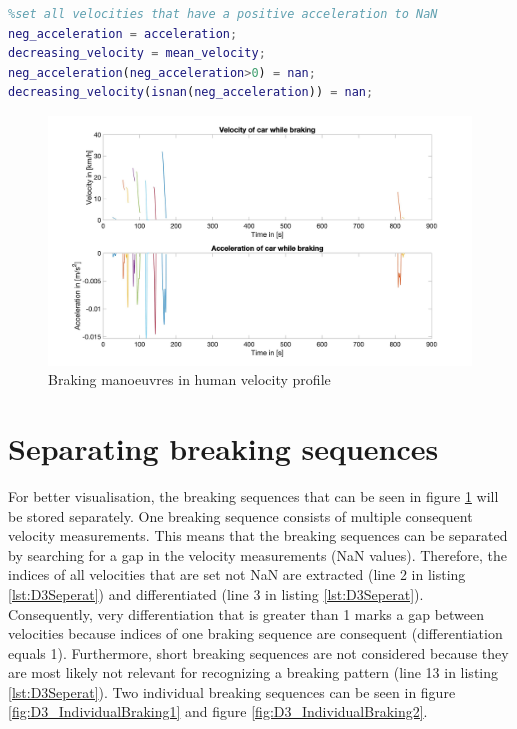 \begin{lstlisting}[language=Matlab,basicstyle=\scriptsize	,caption= Extracting negative acceleration,label= lst:D3Extract]
%search for negative acceleration and set positive acceleration to NaN
%set all velocities that have a positive acceleration to NaN
neg_acceleration = acceleration;
decreasing_velocity = mean_velocity;
neg_acceleration(neg_acceleration>0) = nan;
decreasing_velocity(isnan(neg_acceleration)) = nan;
\end{lstlisting}

\begin{figure}[H]
\centering
\includegraphics[width=1\textwidth]{images/D3_individual_braking.jpg}
\caption{Braking manoeuvres in human velocity profile}
\label{fig:D3_IndividualBraking}
\end{figure}


\section{Separating breaking sequences}
For better visualisation, the breaking sequences that can be seen in figure \ref{fig:D3_IndividualBraking} will be stored separately.
One breaking sequence consists of multiple consequent velocity measurements.
This means that the breaking sequences can be separated by searching for a gap in the velocity measurements (\ac{NaN} values).
Therefore, the indices of all velocities that are set not \ac{NaN} are extracted (line 2 in listing \ref{lst:D3Seperat}) and differentiated (line 3 in listing \ref{lst:D3Seperat}).
Consequently, very differentiation that is greater than 1 marks a gap between velocities because indices of one braking sequence are consequent (differentiation equals 1).
Furthermore, short breaking sequences are not considered because they are most likely not relevant for recognizing a breaking pattern (line 13 in listing \ref{lst:D3Seperat}).
Two individual breaking sequences can be seen in figure \ref{fig:D3_IndividualBraking1} and figure \ref{fig:D3_IndividualBraking2}.

